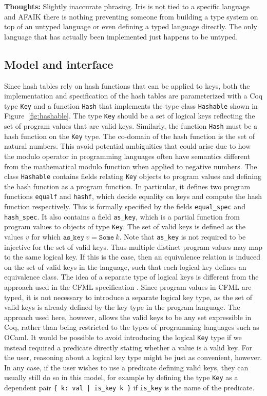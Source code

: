 \documentclass[10pt,a4paper]{article}
\renewcommand{\fcolorbox}[4][]{#4}}
\newcommand{\thoughts}[1]{\noindent\fcolorbox{black}{cyan}{\parbox{\textwidth}{\textbf{Thoughts:} \linebreak #1}}}
\begin{document}
\thoughts{Slightly inaccurate phrasing. Iris is not tied to a specific language and AFAIK there is nothing preventing someone from building a type system on top of an untyped language or even defining a typed language directly. The only language that has actually been implemented just happens to be untyped.}

\subsection{Model and interface}
Since hash tables rely on hash functions that can be applied to keys, both the implementation and specification of the hash tables are parameterized with a Coq type \texttt{Key} and a function \texttt{Hash} that implements the type class \texttt{Hashable} shown in Figure~\ref{fig:hashable}. The type \texttt{Key} should be a set of logical keys reflecting the set of program values that are valid keys. Similarly, the function \texttt{Hash} must be a hash function on the \texttt{Key} type. The co-domain of the hash function is the set of natural numbers. This avoid potential ambiguities that could arise due to how the modulo operator in programming languages often have semantics different from the mathematical modulo function when applied to negative numbers. The class \texttt{Hashable} contains fields relating \texttt{Key} objects to program values and defining the hash function as a program function. In particular, it defines two program functions \texttt{equalf} and \texttt{hashf}, which decide equality on keys and compute the hash function respectively. This is formally specified by the fields \texttt{equal\_spec} and \texttt{hash\_spec}. It also contains a field \texttt{as\_key}, which is a partial function from program values to objects of type \texttt{Key}. The set of valid keys is defined as the values $v$ for which $\mathtt{as\_key} \ v = \mathtt{Some} \ k$.  Note that \texttt{as\_key} is not required to be injective for the set of valid keys. Thus multiple distinct program values may map to the same logical key. If this is the case, then an equivalence relation is induced on the set of valid keys in the language, such that each logical key defines an equivalence class. The idea of a separate type of logical keys is different from the approach used in the CFML specification \cite{pottier-cpp-17}. Since program values in CFML are typed, it is not necessary to introduce a separate logical key type, as the set of valid keys is already defined by the key type in the program language. The approach used here, however, allows the valid keys to be any set expressible in Coq, rather than being restricted to the types of programming languages such as OCaml. It would be possible to avoid introducing the logical \texttt{Key} type if we instead required a predicate directly stating whether a value is a valid key. For the user, reasoning about a logical key type might be just as convenient, however. In any case, if the user wishes to use a predicate defining valid keys, they can usually still do so in this model, for example by defining the type \texttt{Key} as a dependent pair \texttt{\{ k: val | is\_key k \}} if \texttt{is\_key} is the name of the predicate.
\end{document}
